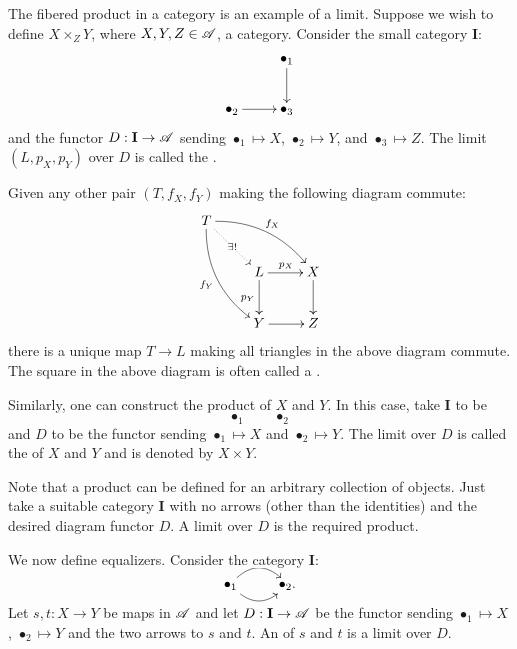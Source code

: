\begin{example}
    The fibered product in a category is an example of a limit. Suppose we wish to define $X\times_Z Y$, where $X, Y, Z\in\mathscr A$, a category. Consider the small category $\mathbf{I}$: 
    \begin{equation*}
        \xymatrix {
            & \bullet_1\ar[d]\\
            \bullet_2\ar[r] & \bullet_3
        }
    \end{equation*}
    and the functor $D: \mathbf{I}\to\mathscr A$ sending $\bullet_1\mapsto X$, $\bullet_2\mapsto Y$, and $\bullet_3\mapsto Z$. The limit $(L, p_X, p_Y)$ over $D$ is called the . 

    Given any other pair $(T, f_X, f_Y)$ making the following diagram commute: 
    \begin{equation*}
        \xymatrix {
            T\ar@/^1pc/[rrd]^{f_X}\ar@/_1pc/[rdd]_{f_Y}\ar@{.>}[rd]|-{\exists !} & & \\
            & L\ar[r]^{p_X}\ar[d]_{p_Y} & X\ar[d]\\
            & Y\ar[r] & Z
        }
    \end{equation*}
    there is a unique map $T\to L$ making all triangles in the above diagram commute. The square in the above diagram is often called a .

    Similarly, one can construct the product of $X$ and $Y$. In this case, take $\mathbf{I}$ to be $$\bullet_1\qquad\bullet_2$$ and $D$ to be the functor sending $\bullet_1\mapsto X$ and $\bullet_2\mapsto Y$. The limit over $D$ is called the  of $X$ and $Y$ and is denoted by $X\times Y$.

    Note that a product can be defined for an arbitrary collection of objects. Just take a suitable category $\mathbf{I}$ with no arrows (other than the identities) and the desired diagram functor $D$. A limit over $D$ is the required product.
\end{example}

\begin{example}
    We now define equalizers. Consider the category $\mathbf I$:
    \begin{equation*}
        \xymatrix {
            \bullet_1\ar@/^1pc/[r]\ar@/_1pc/[r] & \bullet_2.
        }
    \end{equation*}
    Let $s, t: X\to Y$ be maps in $\mathscr A$ and let $D: \mathbf I\to\mathscr A$ be the functor sending $\bullet_1\mapsto X$, $\bullet_2\mapsto Y$ and the two arrows to $s$ and $t$. An  of $s$ and $t$ is a limit over $D$.
\end{example}

